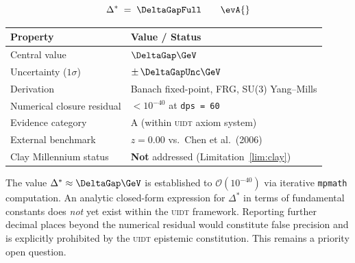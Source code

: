 %
%
\begin{tcolorbox}[
  enhanced, breakable,
  colback  = black!3,
  colframe = uidtgold!70,
  arc      = 4pt,
  boxrule  = 0.8pt,
  left     = 14pt, right = 14pt, top = 12pt, bottom = 12pt,
  title    = {\small\scshape Yang--Mills Spectral Gap --- Canonical Ledger Value},
  fonttitle = \small\bfseries,
]

\centering

\bigskip

\[
  \Delta^*
  \;=\;
  \DeltaGapFull
  \qquad \evA{}
\]

\medskip

\begin{tabular}{@{}ll@{}}
  \toprule
  \textbf{Property} & \textbf{Value / Status} \\
  \midrule
  Central value              & $\DeltaGap\GeV$ \\
  Uncertainty ($1\sigma$)    & $\pm\,\DeltaGapUnc\GeV$ \\
  Derivation                 & Banach fixed-point, FRG, SU(3) Yang--Mills \\
  Numerical closure residual & ${<}10^{-40}$ at \texttt{dps\,=\,60} \\
  Evidence category          & A (within \textsc{uidt} axiom system) \\
  External benchmark         & $z{=}0.00$ vs.\ Chen et al.\ (2006) \evB{} \\
  Clay Millennium status     & \textbf{Not} addressed (Limitation~\ref{lim:clay}) \\
  \bottomrule
\end{tabular}

\bigskip

\begin{openbox}
  \label{open:delta_analytic}
  The value $\Delta^* \approx \DeltaGap\GeV$ is established to
  $\mathcal{O}(10^{-40})$ via iterative \texttt{mpmath} computation.
  An analytic closed-form expression for $\Delta^*$ in terms of
  fundamental constants does \emph{not} yet exist within the \textsc{uidt}
  framework.
  Reporting further decimal places beyond the numerical residual would
  constitute false precision and is explicitly prohibited by the
  \textsc{uidt} epistemic constitution.
  This remains a priority open question.
\end{openbox}

\end{tcolorbox}
